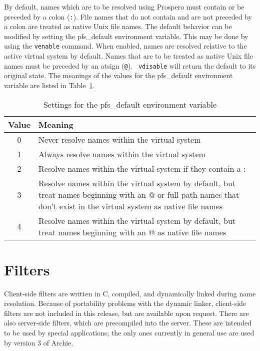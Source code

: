 By default, names which are to be resolved using Prospero must contain
or be preceded by a colon ({\tt :}).  File names that do not contain
and are not preceded by a colon are treated as native Unix file names.
The default behavior can be modified by setting the {\sc pfs\_default}
environment variable.  This may be done by using the {\tt venable}
command.  When enabled, names are resolved relative to the active
virtual system by default.  Names that are to be treated as native
Unix file names must be preceded by an atsign ({\tt @}).  {\tt
vdisable} will return the default to its original state.  The meanings
of the values for the {\sc pfs\_default} environment variable are
listed in Table~\ref{pfs_default_tab}.

\begin{table}
\begin{center}
\caption{Settings for the {\sc pfs\_default} environment
variable\label{pfs_default_tab}}
\vspace{0.1in}
\begin{tabular}{|c|p{3.9in}|} \hline
Value & Meaning \\ \hline \hline
0 & Never resolve names within the virtual system \\ \hline 
1 & Always resolve names within the virtual system \\ \hline 
2 & Resolve names within the virtual system if they contain a : \\ \hline 
3 & Resolve names within the virtual system by default, but 
treat names beginning with an @ or full path names that 
don't exist in the virtual system as native file names \\ \hline 
4 & Resolve names within the virtual system by default, but 
treat names beginning with an @ as native file names \\ \hline
\end{tabular}
\vspace{-0.1in}
\end{center}
\end{table}

\section{Filters}

Client-side filters are written in C, compiled, and dynamically linked
during name resolution.  Because of portability problems with the
dynamic linker, client-side filters are not included in this release,
but are available upon request.  There are also server-side filters,
which are precompiled into the server.  These are intended to be used
by special applications; the only ones currently in general use are
used by version 3 of Archie.

